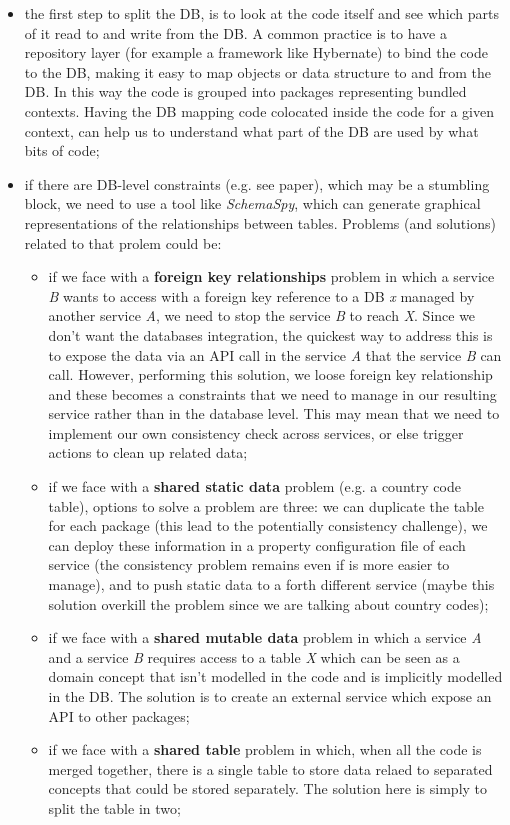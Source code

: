 \documentclass[oneside]{article}
\begin{document}
\begin{itemize}
    \item the first step to split the DB, is to look at the code itself and see which parts of it read to and write from the DB. A common practice is to have a repository layer (for example a framework like Hybernate) to bind the code to the DB, making it easy to map objects or data structure to and from the DB. In this way the code is grouped into packages representing bundled contexts. Having the DB mapping code colocated inside the code for a given context, can help us to understand what part of the DB are used by what bits of code;
    
    \item if there are DB-level constraints (e.g. see paper), which may be a stumbling block, we need to use a tool like \textit{SchemaSpy}, which can generate graphical representations of the relationships between tables. Problems (and solutions) related to that prolem could be:
        \begin{itemize}
            \item if we face with a \textbf{foreign key relationships} problem in which a service \textit{B} wants to access with a foreign key reference to a DB \textit{x} managed by another service \textit{A}, we need to stop the service \textit{B} to reach \textit{X}. Since we don't want the databases integration, the quickest way to address this is to expose the data via an API call in the service \textit{A} that the service \textit{B} can call. However, performing this solution, we loose foreign key relationship and these becomes a constraints that we need to manage in our resulting service rather than in the database level. This may mean that we need to implement our own consistency check across services, or else trigger actions to clean up related data;
            \item if we face with a \textbf{shared static data} problem (e.g. a country code table), options to solve a problem are three: we can duplicate the table for each package (this lead to the potentially consistency challenge), we can deploy these information in a property configuration file of each service (the consistency problem remains even if is more easier to manage), and to push static data to a forth different service (maybe this solution overkill the problem since we are talking about country codes);
            \item if we face with a \textbf{shared mutable data} problem in which a service \textit{A} and a service \textit{B} requires access to a table \textit{X} which can be seen as a domain concept that isn't modelled in the code and is implicitly modelled in the DB. The solution is to create an external service which expose an API to other packages;
            \item if we face with a \textbf{shared table} problem in which, when all the code is merged together, there is a single table to store data relaed to separated concepts that could be stored separately. The solution here is simply to split the table in two;
        \end{itemize}


\end{itemize}
\end{document}
